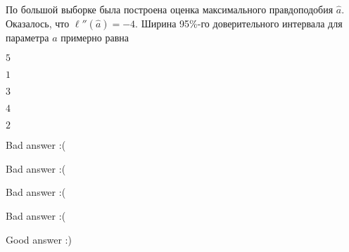 
\begin{question}
По большой выборке была построена оценка максимального правдоподобия
\(\hat a\). Оказалось, что \(\ell''(\hat a) = -4\). Ширина 95\%-го
доверительного интервала для параметра \(a\) примерно равна
\begin{answerlist}
  \item \(5\)
  \item \(1\)
  \item \(3\)
  \item \(4\)
  \item \(2\)
\end{answerlist}
\end{question}

\begin{solution}
\begin{answerlist}
  \item Bad answer :(
  \item Bad answer :(
  \item Bad answer :(
  \item Bad answer :(
  \item Good answer :)
\end{answerlist}
\end{solution}

